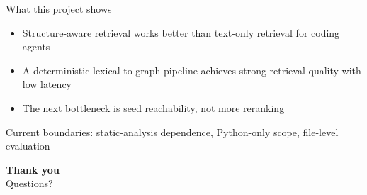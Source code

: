 \documentclass[aspectratio=169,10pt]{beamer}
\begin{document}
\begin{frame}{What this project shows}
  \vspace{10pt}
  \Large
  \begin{itemize}
    \item Structure-aware retrieval works better than text-only retrieval for coding agents
    \vspace{15pt}
    \item A deterministic lexical-to-graph pipeline achieves strong retrieval quality with low latency
    \vspace{15pt}
    \item The next bottleneck is seed reachability, not more reranking
  \end{itemize}
  
  \vspace{40pt}
  \centering
  \normalsize\textcolor{black!60}{Current boundaries: static-analysis dependence, Python-only scope, file-level evaluation}
\end{frame}

\begin{frame}
  \centering
  \vspace{2cm}
  {\Huge \textcolor{DarkNavy}{\textbf{Thank you}}}\\
  \vspace{1cm}
  {\Large Questions?}
\end{frame}
\end{document}
